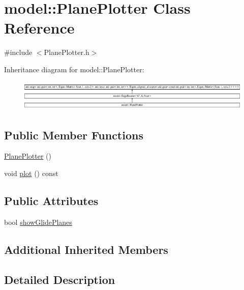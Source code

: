 \hypertarget{classmodel_1_1_plane_plotter}{}\section{model\+:\+:Plane\+Plotter Class Reference}
\label{classmodel_1_1_plane_plotter}


{\ttfamily \#include $<$Plane\+Plotter.\+h$>$}

Inheritance diagram for model\+:\+:Plane\+Plotter\+:\begin{figure}[H]
\begin{center}
\leavevmode
\includegraphics[height=1.486726cm]{classmodel_1_1_plane_plotter}
\end{center}
\end{figure}
\subsection*{Public Member Functions}
\begin{DoxyCompactItemize}
\item 
\hyperlink{classmodel_1_1_plane_plotter_a5ce8ccc91203edf7985afd91bfe182c5}{Plane\+Plotter} ()
\item 
void \hyperlink{classmodel_1_1_plane_plotter_acbcab30738b83012ed2acad412f8ca45}{plot} () const 
\end{DoxyCompactItemize}
\subsection*{Public Attributes}
\begin{DoxyCompactItemize}
\item 
bool \hyperlink{classmodel_1_1_plane_plotter_a831a9c44b773ec5e7b9d1910a7f86b79}{show\+Glide\+Planes}
\end{DoxyCompactItemize}
\subsection*{Additional Inherited Members}


\subsection{Detailed Description}


